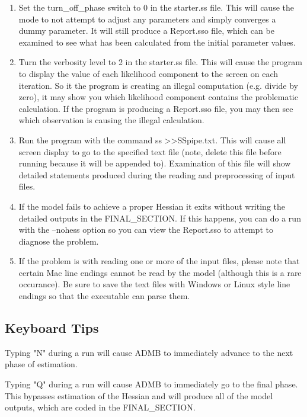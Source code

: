 \begin{enumerate}
	\item Set the turn\_off\_phase switch to 0 in the starter.ss file.  This will cause the mode to not attempt to adjust any parameters and simply converges a dummy parameter.  It will still produce a Report.sso file, which can be examined to see what has been calculated from the initial parameter values.
	\item Turn the verbosity level to 2 in the starter.ss file.  This will cause the program to display the value of each likelihood component to the screen on each iteration.  So it the program is creating an illegal computation (e.g. divide by zero), it may show you which likelihood component contains the problematic calculation.  If the program is producing a Report.sso file, you may then see which observation is causing the illegal calculation.
	\item Run the program with the command ss >>SSpipe.txt.  This will cause all screen display to go to the specified text file (note, delete this file before running because it will be appended to).  Examination of this file will show detailed statements produced during the reading and preprocessing of input files.
	\item If the model fails to achieve a proper Hessian it exits without writing the detailed outputs in the FINAL\_SECTION.  If this happens, you can do a run with the –nohess option so you can view the Report.sso to attempt to diagnose the problem.
	\item If the problem is with reading one or more of the input files, please note that certain Mac line endings cannot be read by the model (although this is a rare occurance). Be sure to save the text files with Windows or Linux style line endings so that the executable can parse them.
\end{enumerate}

\subsection{Keyboard Tips}
Typing "N" during a run will cause ADMB to immediately advance to the next phase of estimation.

Typing "Q"  during a run will cause ADMB to immediately go to the final phase.  This bypasses estimation of the Hessian and will produce all of the model outputs, which are coded in the FINAL\_SECTION.

